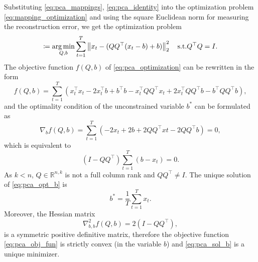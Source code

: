Substituting \eqref{eq:pca_mappings}, \eqref{eq:pca_identity} into the optimization problem \eqref{eq:mapping_optimization} and using the square Euclidean norm for measuring the reconstruction error, we get the optimization problem
\begin{equation}
    [Q^{*}, b^{*}] \coloneqq \argmin_{Q,b} \sum_{t=1}^T \norm{x_t - (QQ^{\top}(x_t-b) + b)}^2_2\quad \text{s.t.} Q^{\top}Q=I.
    \label{eq:pca_optimization}
\end{equation}
The objective function $f(Q,b)$ of \eqref{eq:pca_optimization} can be rewritten in the form
\begin{equation}
    f(Q,b)=\sum_{t=1}^T (x_t^{\top}x_t - 2 x_t^{\top}b + b^{\top}b - x_t^{\top}QQ^{\top}x_t + 2x_t^{\top}QQ^{\top}b - b^{\top}QQ^{\top}b),
    \label{eq:pca_obj_fun}
\end{equation}
and the optimality condition of the unconstrained variable $b^{*}$ can be formulated as
\begin{equation}
    \nabla_bf(Q,b) = \sum_{t=1}^T(-2x_t+2b+2QQ^{\top}xt-2QQ^{\top}b)=0,
\end{equation}
which is equivalent to
\begin{equation}
    (I-QQ^{\top})\sum_{t=1}^T(b-x_t)=0.
    \label{eq:pca_opt_b}
\end{equation}
As $k<n$, $Q \in \mathbb{R}^{n,k}$ is not a full column rank and $QQ^{\top} \neq I$. The unique solution of \eqref{eq:pca_opt_b} is
\begin{equation}
    b^{*} = \frac{1}{T}\sum_{t=1}^T x_t.
\end{equation}
Moreover, the Hessian matrix
\begin{equation}
    \nabla_{b,b}^2 f(Q,b)=2(I-QQ^{\top}),
    \label{eq:pca_sol_b}
\end{equation}
is a symmetric positive definitive matrix, therefore the objective function \eqref{eq:pca_obj_fun} is strictly convex (in the variable $b$) and \eqref{eq:pca_sol_b} is a unique minimizer.

